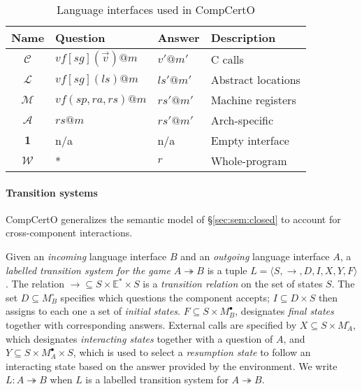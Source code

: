 \documentclass[sigplan,10pt,review,anonymous]{acmart}
\newcommand{\que}{\circ}
\newcommand{\ans}{\bullet}
\begin{document}

\begin{table} %
  \begin{tabular}{clll}
    \hline
    Name & Question & Answer & Description \\
    \hline
    $\mathcal{C}$ &
      $\mathit{vf}[\mathit{sg}](\vec{v})@m$ & $v'@m'$ &
      C calls \\
    $\mathcal{L}$ &
      $\mathit{vf}[\mathit{sg}](\mathit{ls})@m$ & $\mathit{ls}'@m'$ &
      Abstract locations \\
    $\mathcal{M}$ &
      $\mathit{vf}(\mathit{sp},\mathit{ra},\mathit{rs})@m$ & $\mathit{rs}'@m'$ &
      Machine registers \\
    $\mathcal{A}$ &
      $\mathit{rs}@m$ & $\mathit{rs}'@m'$ &
      Arch-specific \\
    $\mathbf{1}$ & n/a & n/a &
      Empty interface \\
    $\mathcal{W}$ & * & $r$ &
      Whole-program \\
    \hline
  \end{tabular}
  \caption{Language interfaces used in CompCertO}
  \label{tbl:li}
\end{table}

\paragraph{Transition systems} %

CompCertO generalizes
the semantic model of
\S\ref{sec:sem:closed}
to account for cross-component interactions.

\begin{definition} \label{def:lts}
Given an \emph{incoming} language interface $B$
and an \emph{outgoing} language interface $A$,
a \emph{labelled transition system for the game $A \twoheadrightarrow B$}
is a tuple $L = \langle S, \rightarrow, D, I, X, Y, F \rangle$.
The relation
${\rightarrow} \subseteq S \times \mathbb{E}^* \times S$ is
a \emph{transition relation} on the set of states $S$.
The set $D \subseteq M_B^\que$ specifies which
questions the component accepts;
$I \subseteq D \times S$ then
assigns to each one a set of \emph{initial states}.
$F \subseteq S \times M_B^\ans$,
designates \emph{final states} together with corresponding answers.
External calls are specified by
$X \subseteq S \times M_A^\que$,
which designates \emph{interacting states} together with
a question of $A$, and
$Y \subseteq S \times M_A^\ans \times S$,
which is used to select a \emph{resumption state}
to follow an interacting state
based on the answer provided by the environment.
We write $L : A \twoheadrightarrow B$ when
$L$ is a labelled transition system for $A \twoheadrightarrow B$.
\end{definition}
\end{document}
